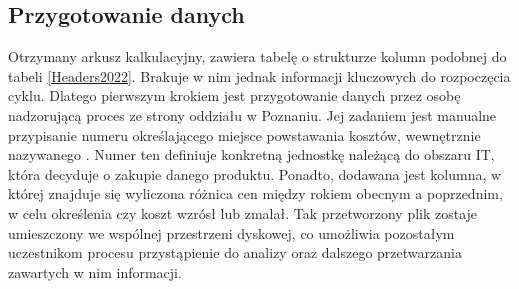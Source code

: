 \subsection{Przygotowanie danych}
Otrzymany arkusz kalkulacyjny, zawiera tabelę o strukturze kolumn podobnej do tabeli \ref{Headers2022}. Brakuje w nim jednak informacji kluczowych do rozpoczęcia cyklu.
Dlatego pierwszym krokiem jest przygotowanie danych przez osobę nadzorującą proces ze strony oddziału w Poznaniu.
Jej zadaniem jest manualne przypisanie numeru określającego miejsce powstawania kosztów, wewnętrznie nazywanego . Numer ten definiuje konkretną jednostkę należącą do obszaru IT, która decyduje o zakupie danego produktu. Ponadto, dodawana jest kolumna, w której znajduje się wyliczona różnica cen między rokiem obecnym a poprzednim, w celu określenia czy koszt wzrósł lub zmalał. Tak przetworzony plik zostaje umieszczony we wspólnej przestrzeni dyskowej, co umożliwia pozostałym uczestnikom procesu przystąpienie do analizy oraz dalszego przetwarzania zawartych w nim informacji.

\renewcommand{\arraystretch}{1.1} %
\begin{table}[H] %
    \begin{adjustwidth}{-50pt}{-20pt}
        \centering
        \caption{Nagłówki kolumn z arkusza kalkulacyjnego z roku 2022}
        \label{Headers2022}
    \end{adjustwidth}
\end{table}
